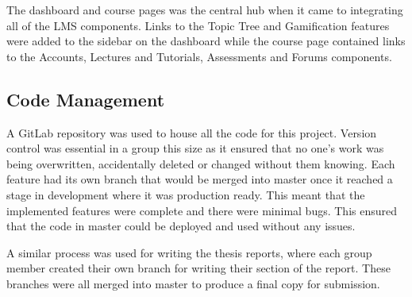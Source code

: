 The dashboard and course pages was the central hub when it came to integrating all of the LMS components.
Links to the Topic Tree and Gamification features were added to the sidebar on the dashboard while the course page contained links to the Accounts, Lectures and Tutorials, Assessments and Forums components.

\subsection{Code Management}
A GitLab repository was used to house all the code for this project.
Version control was essential in a group this size as it ensured that no one's work was being overwritten, accidentally deleted or changed without them knowing.
Each feature had its own branch that would be merged into master once it reached a stage in development where it was production ready.
This meant that the implemented features were complete and there were minimal bugs.
This ensured that the code in master could be deployed and used without any issues.

A similar process was used for writing the thesis reports, where each group member created their own branch for writing their section of the report.
These branches were all merged into master to produce a final copy for submission.


